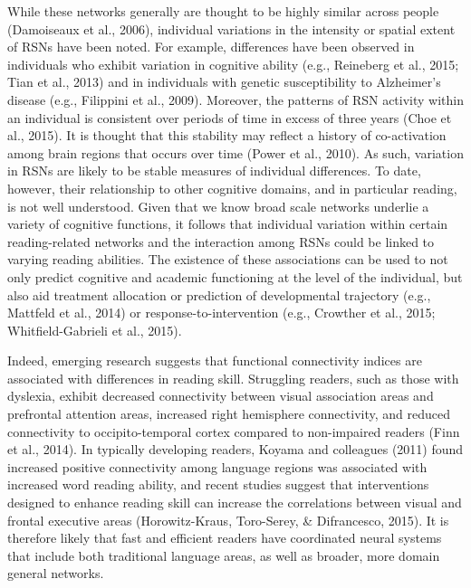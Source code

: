 While these networks generally are thought to be highly similar across people (Damoiseaux et al., 2006), individual variations in the intensity or spatial extent of RSNs have been noted. For example, differences have been observed in individuals who exhibit variation in cognitive ability (e.g., Reineberg et al., 2015; Tian et al., 2013) and in individuals with genetic susceptibility to Alzheimer’s disease (e.g., Filippini et al., 2009). Moreover, the patterns of RSN activity within an individual is consistent over periods of time in excess of three years (Choe et al., 2015). It is thought that this stability may reflect a history of co-activation among brain regions that occurs over time (Power et al., 2010). As such, variation in RSNs are likely to be stable measures of individual differences. To date, however, their relationship to other cognitive domains, and in particular reading, is not well understood.  Given that we know broad scale networks underlie a variety of cognitive functions, it follows that individual variation within certain reading-related networks and the interaction among RSNs could be linked to varying reading abilities. The existence of these associations can be used to not only predict cognitive and academic functioning at the level of the individual, but also aid treatment allocation or prediction of developmental trajectory (e.g., Mattfeld et al., 2014) or response-to-intervention (e.g., Crowther et al., 2015; Whitfield-Gabrieli et al., 2015). 

Indeed, emerging research suggests that functional connectivity indices are associated with differences in reading skill. Struggling readers, such as those with dyslexia, exhibit decreased connectivity between visual association areas and prefrontal attention areas, increased right hemisphere connectivity, and reduced connectivity to occipito-temporal cortex compared to non-impaired readers (Finn et al., 2014).  In typically developing readers, Koyama and colleagues (2011) found increased positive connectivity among language regions was associated with increased word reading ability, and recent studies suggest that interventions designed to enhance reading skill can increase the correlations between visual and frontal executive areas (Horowitz-Kraus, Toro-Serey, & Difrancesco, 2015). It is therefore likely that fast and efficient readers have coordinated neural systems that include both traditional language areas, as well as broader, more domain general networks.  

